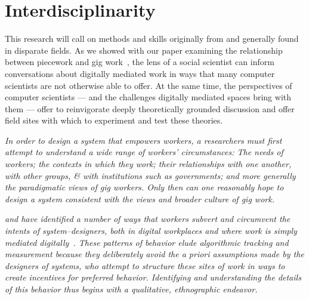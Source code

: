 \documentclass{article}
\newcommand{\topic}[1]{{\color{Blue}#1}}
\newenvironment{blah}{\par\color{Gray}\itshape}{\par}
\begin{document}
\section*{Interdisciplinarity}
\topic{This research will call on methods and skills originally from and generally found in disparate fields.}
As we showed with our paper examining the relationship between piecework and gig work~\cite{pieceworkCrowdworkGigwork},
the lens of a social scientist can inform conversations about digitally mediated work in ways that many computer scientists are not otherwise able to offer.
At the same time, the perspectives of computer scientists
--- and the challenges digitally mediated spaces bring with them ---
offer to reinvigorate deeply theoretically grounded discussion and offer field sites with which to experiment and test these theories.

\begin{blah}
In order to design a system that empowers workers,
a researchers must first attempt to understand a wide range of workers' circumstances:
The needs of workers;
the contexts in which they work;
their relationships with one another, with other groups, \& with institutions such as governments;
and more generally the paradigmatic views of gig workers.
Only then can one reasonably hope to design a system consistent with the views and broader culture of gig work.
\end{blah}

\begin{blah}
\citeauthor{uberAlgorithm} and \citeauthor{crowdcollab} have identified a number of ways that workers subvert and circumvent the intents of system--designers,
both in digital workplaces and where work is simply mediated digitally~\cite{uberAlgorithm,crowdcollab}.
These patterns of behavior elude algorithmic tracking and measurement because they deliberately avoid the \textit{a priori} assumptions made by the designers of systems,
who attempt to structure these sites of work in ways to create incentives for preferred behavior.
Identifying and understanding the details of this behavior thus begins with a qualitative,
ethnographic endeavor.
\end{blah}
\end{document}
